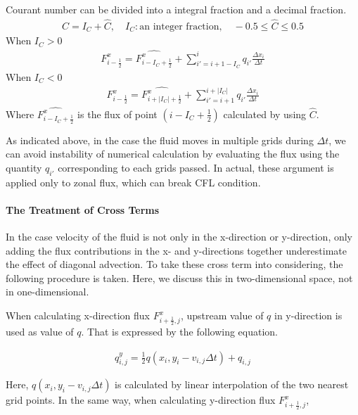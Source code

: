 Courant number can be divided into a integral fraction and a decimal fraction. \begin{eqnarray}C=I_{C}+\hat{C},\quad I_{C}: \text{an integer fraction},\quad -0.5\le \hat{C} \le 0.5\end{eqnarray} When \(I_{C}>0\)
\begin{eqnarray}F^{x}_{i-\frac{1}{2}}=\hat{F^{x}_{i-I_{C}+\frac{1}{2}}}+\sum^{i}_{i'=i+1-I_{C}} q_{i'} \frac{\Delta x_{i}}{\Delta t}\end{eqnarray} When \(I_{C}<0\)
\begin{eqnarray}F^{x}_{i-\frac{1}{2}}=\hat{F^{x}_{i+|I_{C}|+\frac{1}{2}}}+\sum^{i+|I_{C}|}_{i'=i+1} q_{i'} \frac{\Delta x_{i}}{\Delta t}\end{eqnarray} Where \(\hat{F^{x}_{i-I_{C}+\frac{1}{2}}}\) is the flux of point
\((i-I_{C}+\frac{1}{2})\) calculated by using \(\hat{C}\).

As indicated above, in the case the fluid moves in multiple grids during \(\Delta t\), we can avoid instability of numerical calculation by evaluating the flux using the quantity \(q_{i'}\)
corresponding to each grids passed. In actual, these argument is applied only to zonal flux, which can break CFL condition.

\hypertarget{the-treatment-of-cross-terms}{%
\paragraph{The Treatment of Cross Terms}\label{the-treatment-of-cross-terms}}

In the case velocity of the fluid is not only in the x-direction or y-direction, only adding the flux contributions in the x- and y-directions together underestimate the effect of diagonal advection.
To take these cross term into considering, the following procedure is taken. Here, we discuss this in two-dimensional space, not in one-dimensional.

When calculating x-direction flux \(F^{x}_{i+\frac{1}{2},j}\), upstream value of \(q\) in y-direction is used as value of \(q\). That is expressed by the following equation.

\begin{eqnarray}
q^{y}_{i,j}=\frac{1}{2} {q(x_{i},y_{i}-v_{i,j}\Delta t)+q_{i,j}}
\end{eqnarray}

Here, \(q(x_{i},y_{i}-v_{i,j}\Delta t)\) is calculated by linear interpolation of the two nearest grid points. In the same way, when calculating y-direction flux \(F^{x}_{i+\frac{1}{2},j}\),

